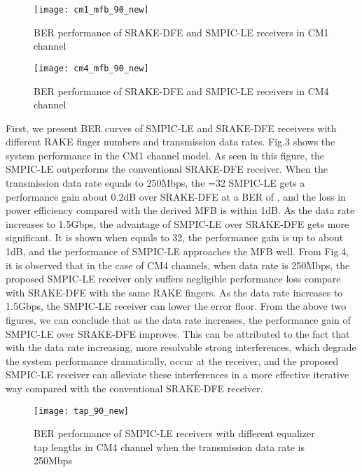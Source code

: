 \documentclass[journal]{IEEEtran}
\begin{document}
\begin{figure}[t]
\begin{center}
  \texttt{[image: cm1\_mfb\_90\_new]}
  \caption{BER performance of SRAKE-DFE and SMPIC-LE receivers in CM1 channel}
  \label{cm1}
\end{center}
\end{figure}



\begin{figure}[t]
\begin{center}
  \texttt{[image: cm4\_mfb\_90\_new]}
  \caption{BER performance of SRAKE-DFE and SMPIC-LE receivers in CM4 channel}
  \label{cm4}
\end{center}
\end{figure}





First, we present BER curves of SMPIC-LE and SRAKE-DFE receivers
with different RAKE finger numbers and transmission data rates.
Fig.3 shows the system performance in the CM1 channel model. As seen
in this figure, the SMPIC-LE outperforms the conventional SRAKE-DFE
receiver. When the transmission data rate equals to 250Mbps, the
=32 SMPIC-LE gets a performance gain about 0.2dB over 
SRAKE-DFE at a BER of , and the loss in power efficiency
compared with the derived MFB is within 1dB. As the data rate
increases to 1.5Gbps, the advantage of SMPIC-LE over SRAKE-DFE gets
more significant. It is shown when  equals to 32, the performance
gain is up to about 1dB, and the performance of SMPIC-LE approaches
the MFB well. From Fig.4, it is observed that in the case of CM4
channels, when data rate is 250Mbps, the proposed SMPIC-LE receiver
only suffers negligible performance loss compare with SRAKE-DFE with
the same RAKE fingers. As the data rate increases to 1.5Gbps, the
SMPIC-LE receiver can lower the error floor. From the above two
figures, we can conclude that as the data rate increases, the
performance gain of SMPIC-LE over SRAKE-DFE improves. This can be
attributed to the fact that with the data rate increasing, more
resolvable strong interferences, which degrade the system
performance dramatically, occur at the receiver, and the proposed
SMPIC-LE receiver can alleviate these interferences in a more
effective iterative way compared with the conventional SRAKE-DFE
receiver.

\begin{figure}[t]
\begin{center}
  \texttt{[image: tap\_90\_new]}
  \caption{BER performance of SMPIC-LE receivers with different equalizer tap lengths in CM4 channel when the transmission data rate is 250Mbps}
  \label{tap}
\end{center}
\end{figure}
\end{document}
